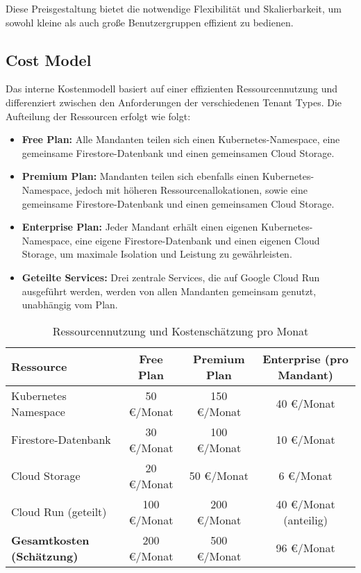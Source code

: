 Diese Preisgestaltung bietet die notwendige Flexibilität und Skalierbarkeit, um sowohl kleine als auch große Benutzergruppen effizient zu bedienen.

\subsection{Cost Model}
Das interne Kostenmodell basiert auf einer effizienten Ressourcennutzung und differenziert zwischen den Anforderungen der verschiedenen Tenant Types. Die Aufteilung der Ressourcen erfolgt wie folgt:

\begin{itemize}
    \item \textbf{Free Plan:} Alle Mandanten teilen sich einen Kubernetes-Namespace, eine gemeinsame Firestore-Datenbank und einen gemeinsamen Cloud Storage.
    \item \textbf{Premium Plan:} Mandanten teilen sich ebenfalls einen Kubernetes-Namespace, jedoch mit höheren Ressourcenallokationen, sowie eine gemeinsame Firestore-Datenbank und einen gemeinsamen Cloud Storage.
    \item \textbf{Enterprise Plan:} Jeder Mandant erhält einen eigenen Kubernetes-Namespace, eine eigene Firestore-Datenbank und einen eigenen Cloud Storage, um maximale Isolation und Leistung zu gewährleisten.
    \item \textbf{Geteilte Services:} Drei zentrale Services, die auf Google Cloud Run ausgeführt werden, werden von allen Mandanten gemeinsam genutzt, unabhängig vom Plan.
\end{itemize}

\begin{table}[h!]
\centering
\caption{Ressourcennutzung und Kostenschätzung pro Monat}
\begin{tabular}{|l|c|c|c|}
\hline
\textbf{Ressource}               & \textbf{Free Plan} & \textbf{Premium Plan} & \textbf{Enterprise (pro Mandant)} \\ \hline
Kubernetes Namespace             & 50 €/Monat         & 150 €/Monat           & 40 €/Monat                        \\ \hline
Firestore-Datenbank              & 30 €/Monat         & 100 €/Monat           & 10 €/Monat                        \\ \hline
Cloud Storage                    & 20 €/Monat         & 50 €/Monat            & 6 €/Monat                         \\ \hline
Cloud Run (geteilt)              & 100 €/Monat        & 200 €/Monat           & 40 €/Monat (anteilig)              \\ \hline
\textbf{Gesamtkosten (Schätzung)} & 200 €/Monat        & 500 €/Monat           & 96 €/Monat                        \\ \hline
\end{tabular}
\label{tab:costmodel}
\end{table}

